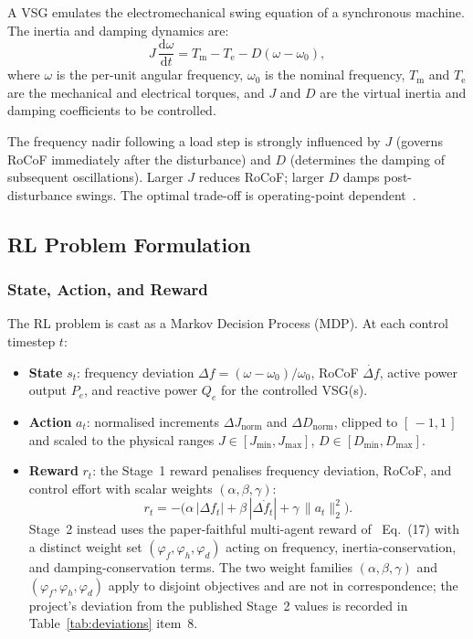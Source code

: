 \documentclass{unnc-fyp}
\begin{document}
A VSG emulates the electromechanical swing equation of a synchronous
machine.
The inertia and damping dynamics are:
\begin{equation}
  J\,\frac{\mathrm{d}\omega}{\mathrm{d}t}
    = T_{\mathrm{m}} - T_{\mathrm{e}} - D(\omega - \omega_{0}),
  \label{eq:swing}
\end{equation}
where $\omega$ is the per-unit angular frequency, $\omega_{0}$ is the
nominal frequency, $T_{\mathrm{m}}$ and $T_{\mathrm{e}}$ are the
mechanical and electrical torques, and $J$ and $D$ are the virtual
inertia and damping coefficients to be controlled.

The frequency nadir following a load step is strongly influenced by $J$
(governs RoCoF immediately after the disturbance) and $D$ (determines
the damping of subsequent oscillations).
Larger $J$ reduces RoCoF; larger $D$ damps post-disturbance swings.
The optimal trade-off is operating-point dependent~\cite{bevrani2014vsg}.

\subsection{RL Problem Formulation}

\subsubsection{State, Action, and Reward}

The RL problem is cast as a Markov Decision Process (MDP).
At each control timestep $t$:
\begin{itemize}
  \item \textbf{State} $s_t$: frequency deviation
        $\Delta f = (\omega - \omega_0)/\omega_0$, RoCoF
        $\dot{\Delta f}$, active power output $P_e$, and reactive power
        $Q_e$ for the controlled VSG(s).
  \item \textbf{Action} $a_t$: normalised increments
        $\Delta J_{\mathrm{norm}}$ and $\Delta D_{\mathrm{norm}}$,
        clipped to $[\,-1, 1\,]$ and scaled to the physical ranges
        $J \in [J_{\min}, J_{\max}]$, $D \in [D_{\min}, D_{\max}]$.
  \item \textbf{Reward} $r_t$: the Stage~1 reward penalises
        frequency deviation, RoCoF, and control effort with
        scalar weights $(\alpha, \beta, \gamma)$:
        \begin{equation}
          r_t = -\bigl(\alpha\,|\Delta f_t|
                      + \beta\,|\Delta\dot{f}_t|
                      + \gamma\,\|a_t\|_2^2\bigr).
          \label{eq:reward}
        \end{equation}
        Stage~2 instead uses the paper-faithful multi-agent reward
        of~\cite{yang2023ddic} Eq.~(17) with a distinct weight set
        $(\varphi_f, \varphi_h, \varphi_d)$ acting on frequency,
        inertia-conservation, and damping-conservation terms.
        The two weight families $(\alpha, \beta, \gamma)$ and
        $(\varphi_f, \varphi_h, \varphi_d)$ apply to disjoint
        objectives and are not in correspondence; the project's
        deviation from the published Stage~2 values is recorded in
        Table~\ref{tab:deviations} item~8.
\end{itemize}
\end{document}
